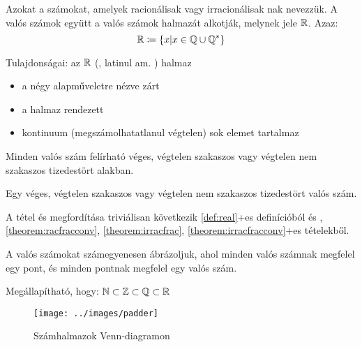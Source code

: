 \begin{defin2}
\label{def:real}
Azokat a számokat, amelyek racionálisak vagy irracionálisak nak nevezzük. A valós számok együtt a valós számok halmazát alkotják,
melynek jele $\mathbb{R}$. Azaz:
\[
  \mathbb{R} \coloneqq \{x | x \in \mathbb{Q} \cup \mathbb{Q^*}\}
\]

Tulajdonságai: az $\mathbb{R}$ (, latinul am. )
halmaz
\begin{itemize}
\item a négy alapműveletre nézve zárt
\item a halmaz rendezett
\item kontinuum (megszámolhatatlanul végtelen) sok elemet tartalmaz
\end{itemize}
\end{defin2}

\begin{theorem2}
Minden valós szám felírható véges, végtelen szakaszos vagy végtelen nem
szakaszos tizedestört alakban.
\end{theorem2}

\begin{theoremconv2}
Egy véges, végtelen szakaszos vagy végtelen nem szakaszos tizedestört  valós
szám.
\end{theoremconv2}

\begin{proof2}
A tétel és megfordítása triviálisan következik \atold\ref{def:real}+es{}
definícióból és , \ref{theorem:racfracconv},
\ref{theorem:irracfrac}, \told\ref{theorem:irracfracconv}+es{} tételekből.
\end{proof2}

\begin{note2}
A valós számokat számegyenesen ábrázoljuk, ahol minden valós számnak megfelel
egy pont, és minden pontnak megfelel egy valós szám.
\end{note2}

\begin{note2}
Megállapítható, hogy:
$\mathbb{N} \subset \mathbb{Z} \subset \mathbb{Q} \subset \mathbb{R}$

\begin{figure}[!h]
	\centering
	\texttt{[image: ../images/padder]}
	\caption{Számhalmazok Venn-diagramon} 
	\label{fig:numberset}
\end{figure}
\end{note2}

